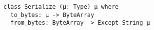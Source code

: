 \begin{lstlisting}[language=lean]
class Serialize (μ: Type) μ where
  to_bytes: μ -> ByteArray
  from_bytes: ByteArray -> Except String μ
\end{lstlisting}
